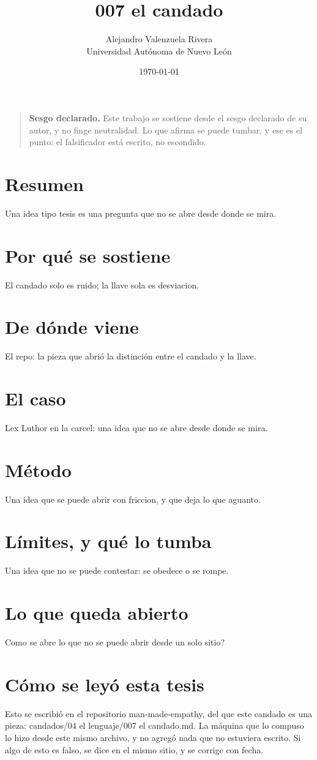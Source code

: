 \documentclass[11pt,a4paper]{article}
\title{007 el candado}
\author{Alejandro Valenzuela Rivera\\\small Universidad Autónoma de Nuevo León}
\date{\today}
\begin{document}
\maketitle

\begin{quote}
\textbf{Sesgo declarado.} Este trabajo se sostiene desde el sesgo declarado de su autor, y no finge neutralidad. Lo que afirma se puede tumbar, y ese es el punto: el falsificador está escrito, no escondido.
\end{quote}

\section*{Resumen}
Una idea tipo tesis es una pregunta que no se abre desde donde se mira.

\section{Por qué se sostiene}
El candado solo es ruido; la llave sola es desviacion.

\section{De dónde viene}
El repo: la pieza que abrió la distinción entre el candado y la llave.

\section{El caso}
Lex Luthor en la carcel: una idea que no se abre desde donde se mira.

\section{Método}
Una idea que se puede abrir con friccion, y que deja lo que aguanto.

\section{Límites, y qué lo tumba}
Una idea que no se puede contestar: se obedece o se rompe.

\section{Lo que queda abierto}
\textquestiondown{}Como se abre lo que no se puede abrir desde un solo sitio?

\section*{Cómo se leyó esta tesis}
Esto se escribió en el repositorio man-made-empathy, del que este candado es una pieza: candados/04 el lenguaje/007 el candado.md. La máquina que lo compuso lo hizo desde este mismo archivo, y no agregó nada que no estuviera escrito. Si algo de esto es falso, se dice en el mismo sitio, y se corrige con fecha.
\end{document}
